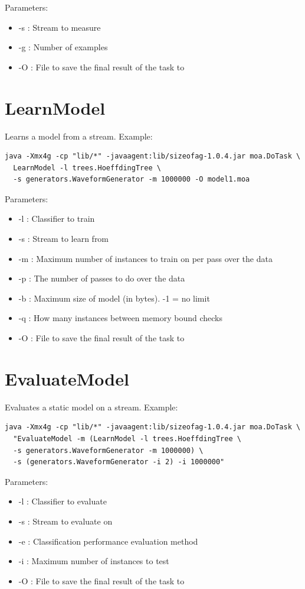 \documentclass[a4paper,12pt,twoside]{book}
\begin{document}
Parameters:
\begin{itemize}
\item -s : Stream to measure
\item -g : Number of examples
\item -O : File to save the final result of the task to
\end{itemize}

\section{LearnModel} 
Learns a model from a stream.
Example:
\begin{footnotesize}\begin{verbatim}
java -Xmx4g -cp "lib/*" -javaagent:lib/sizeofag-1.0.4.jar moa.DoTask \
  LearnModel -l trees.HoeffdingTree \
  -s generators.WaveformGenerator -m 1000000 -O model1.moa
\end{verbatim}\end{footnotesize}

Parameters:
\begin{itemize}
\item -l : Classifier to train
\item -s : Stream to learn from
\item -m : Maximum number of instances to train on per pass over the data
\item -p : The number of passes to do over the data
\item -b : Maximum size of model (in bytes). -1 = no limit
\item -q : How many instances between memory bound checks
\item -O : File to save the final result of the task to
\end{itemize}

\section{EvaluateModel} 
Evaluates a static model on a stream.
Example:
\begin{footnotesize}\begin{verbatim}
java -Xmx4g -cp "lib/*" -javaagent:lib/sizeofag-1.0.4.jar moa.DoTask \
  "EvaluateModel -m (LearnModel -l trees.HoeffdingTree \
  -s generators.WaveformGenerator -m 1000000) \
  -s (generators.WaveformGenerator -i 2) -i 1000000"
\end{verbatim}\end{footnotesize}

Parameters:
\begin{itemize}
\item -l : Classifier to evaluate
\item -s : Stream to evaluate on
\item -e : Classification performance evaluation method
\item -i : Maximum number of instances to test
\item -O : File to save the final result of the task to
\end{itemize}
\end{document}
